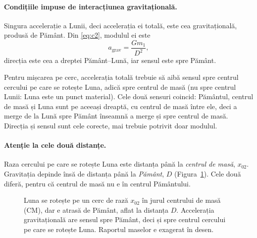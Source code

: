 \documentclass[11pt,a4paper]{article}
\begin{document}
\paragraph{Condițiile impuse de interacțiunea gravitațională.} Singura accelerație a Lunii, deci accelerația ei totală, este cea gravitațională, produsă de Pământ. Din \eqref{eq:c2}, modulul ei este
\[
  a_{\text{grav}} = \frac{G m_1}{D^2},
\]
direcția este cea a dreptei Pământ--Lună, iar sensul este spre Pământ.

Pentru mișcarea pe cerc, accelerația totală trebuie să aibă sensul spre centrul cercului pe care se rotește Luna, adică spre centrul de masă (nu spre centrul Lunii: Luna este un punct material). Cele două sensuri coincid: Pământul, centrul de masă și Luna sunt pe aceeași dreaptă, cu centrul de masă între ele, deci a merge de la Lună spre Pământ înseamnă a merge și spre centrul de masă. Direcția și sensul sunt cele corecte, mai trebuie potrivit doar modulul.

\paragraph{Atenție la cele două distanțe.} Raza cercului pe care se rotește Luna este distanța până la \emph{centrul de masă}, $x_{02}$. Gravitația depinde însă de distanța până la \emph{Pământ}, $D$ (Figura~\ref{fig:cerc}). Cele două diferă, pentru că centrul de masă nu e în centrul Pământului.

\begin{figure}[H]
\centering
{}
\caption{Luna se rotește pe un cerc de rază $x_{02}$ în jurul centrului de masă (CM), dar e atrasă de Pământ, aflat la distanța $D$. Accelerația gravitațională are sensul spre Pământ, deci și spre centrul cercului pe care se rotește Luna. Raportul maselor e exagerat în desen.}
\label{fig:cerc}
\end{figure}
\end{document}
